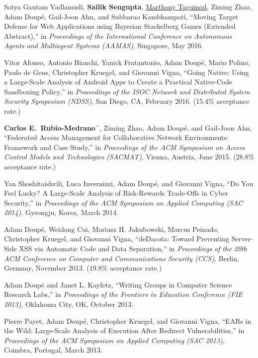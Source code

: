 \documentclass[11pt,letterpaper,sans]{moderncv}
\begin{document}
\begin{etaremune}
\item Satya Gautam Vadlamudi, \textbf{Sailik Sengupta}, \underline{Marthony
  Taguinod}, Ziming Zhao, Adam Doup\'e, Gail-Joon Ahn, and
  Subbarao Kambhampati, ``Moving Target Defense for Web Applications
  using Bayesian Stackelberg Games (Extended Abstract),'' in
  \emph{Proceedings of the International Conference on Autonomous
    Agents and Multiagent Systems (AAMAS)}, Singapore, May 2016.

\item Vitor Afonso, Antonio Bianchi, Yanick Fratantonio, Adam
  Doup\'e, Mario Polino, Paulo de Geus, Christopher Kruegel, and
  Giovanni Vigna, ``Going Native: Using a Large-Scale Analysis of
  Android Apps to Create a Practical Native-Code Sandboxing Policy,''
  in \emph{Proceedings of the ISOC Network and Distributed System
    Security Symposium (NDSS)}, San Diego, CA, February 2016. (15.4\%
  acceptance rate.)

\item \textbf{Carlos E.\ Rubio-Medrano}$^{\sim}$, Ziming Zhao, Adam
  Doup\'e, and Gail-Joon Ahn, ``Federated Access Management for
  Collaborative Network Environments: Framework and Case Study,'' in
  \emph{Proceedings of the ACM Symposium on Access Control Models and
    Technologies (SACMAT)}, Vienna, Austria, June 2015. (28.8\%
  acceptance rate.)

\item Yan Shoshitaishvili, Luca Invernizzi, Adam Doup\'e, and
  Giovanni Vigna, ``Do You Feel Lucky? A Large-Scale Analysis of
  Risk-Rewards Trade-Offs in Cyber Security,'' in \emph{Proceedings of
    the ACM Symposium on Applied Computing (SAC 2014)}, Gyeongju,
  Korea, March 2014.

\item Adam Doup\'e, Weidong Cui, Mariusz H. Jakubowski,
  Marcus Peinado, Christopher Kruegel, and Giovanni Vigna, ``deDacota:
  Toward Preventing Server-Side XSS via Automatic Code and Data
  Separation,'' in \emph{Proceedings of the 20th ACM Conference on
    Computer and Communications Security (CCS)}, Berlin, Germany,
  November 2013. (19.8\% acceptance rate.)

\item Adam Doup\'e and Janet L. Kayfetz, ``Writing Groups in
  Computer Science Research Labs,'' in \emph{Proceedings of the
    Frontiers in Education Conference (FIE 2013)}, Oklahoma City, OK,
  October 2013.

\item Pierre Payet, Adam Doup\'e, Christopher
  Kruegel, and Giovanni Vigna, ``EARs in the Wild: Large-Scale
  Analysis of Execution After Redirect Vulnerabilities,'' in
  \emph{Proceedings of the ACM Symposium on Applied Computing (SAC
    2013)}, Coimbra, Portugal, March 2013.


\end{etaremune}
\end{document}
